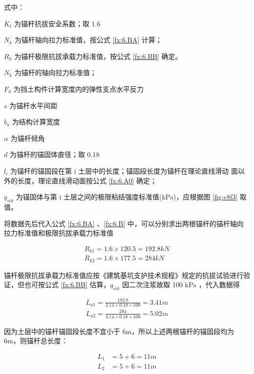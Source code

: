 式中： 

$K_t$ 为锚杆抗拔安全系数；取 1.6

$N_k$ 为锚杆轴向拉力标准值，按公式 \ref{fx:6.BA} 计算；

$R_k$ 为锚杆极限抗拔承载力标准值，按公式 \ref{fx:6.BB} 确定。

$N_k$ 为锚杆的轴向拉力标准值；

$F_h$ 为挡土构件计算宽度内的弹性支点水平反力

$s$ 为锚杆水平间距

$b_a$ 为结构计算宽度

$\alpha$ 为锚杆倾角

$d$ 为锚杆的锚固体直径；取 0.18

$l_i$ 为锚杆的锚固段在第 i 土层中的长度；锚固段长度为锚杆在理论直线滑动
面以外的长度，理论直线滑动面按公式 \ref{fx:6.A0} 确定；

$q_{sik}$ 为锚固体与第 i 土层之间的极限粘结强度标准值(kPa)，应根据图 \ref{fig:c8f3} 取值。

将数据先后代入公式 \ref{fx:6.BA} 、\ref{fx:6.B} 中，可以分别求出两根锚杆的锚杆轴向拉力标准值和极限抗拔承载力标准值

\begin{align*}
    R_{k1}=1.6×120.5=192.8kN\\
    R_{k2}=1.6×177.5=284kN
\end{align*}

锚杆极限抗拔承载力标准值应按《建筑基坑支护技术规程》规定的抗拔试验进行验证，但也可按公式 \ref{fx:6.BB} 估算，$q_{sik}$ 因二次注浆故取 100 kPa ，代入数据得

\begin{align*}
    L_{a1}=\frac{192.8}{3.14\times 0.18\times 100}=3.41 m\\
    L_{a2}=\frac{284}{3.14\times 0.18\times 100}=5.02 m
\end{align*}

因为土层中的锚杆锚固段长度不宜小于 6m，所以上述两根锚杆的锚固段均为 6m，则锚杆总长度：

\begin{align*}
L_1&=5+6=11m\\
L_2&=5+6=11m
\end{align*}

